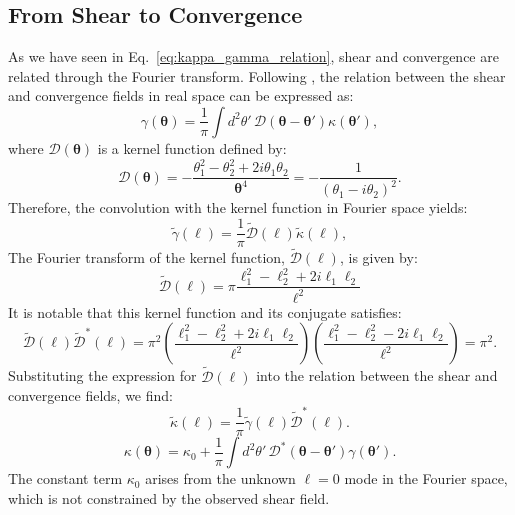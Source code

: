 \subsection{From Shear to Convergence}
As we have seen in Eq.~\eqref{eq:kappa_gamma_relation}, shear and convergence are related through the Fourier transform. Following \citet{1993ApJ...404..441K}, the relation between the shear and convergence fields in real space can be expressed as:
\begin{equation}
    \gamma(\boldsymbol{\theta}) = \frac{1}{\pi} \int d^2\theta' \, \mathcal{D}(\boldsymbol{\theta} - \boldsymbol{\theta'}) \kappa(\boldsymbol{\theta'}),
\end{equation}
where $\mathcal{D}(\boldsymbol{\theta})$ is a kernel function defined by:
\begin{equation}
    \mathcal{D}(\boldsymbol{\theta}) = - \frac{\theta_1^2 - \theta_2^2 + 2i\theta_1\theta_2}{\boldsymbol{\theta}^4} = - \frac{1}{(\theta_1 - i\theta_2)^2}.
\end{equation}
Therefore, the convolution with the kernel function in Fourier space yields:
\begin{equation}
    \tilde{\gamma}(\boldsymbol{\ell}) = \frac{1}{\pi}\tilde{\mathcal{D}}(\boldsymbol{\ell}) \tilde{\kappa}(\boldsymbol{\ell}),
\end{equation}
The Fourier transform of the kernel function,  $\tilde{\mathcal{D}}(\boldsymbol{\ell})$, is given by:
\begin{equation}
    \tilde{\mathcal{D}}(\boldsymbol{\ell}) = \pi \frac{\ell_1^2 - \ell_2^2 + 2i\ell_1\ell_2}{\ell^2} 
\end{equation}
It is notable that this kernel function and its conjugate satisfies:
\begin{equation}
    \tilde{\mathcal{D}}(\boldsymbol{\ell})\tilde{\mathcal{D}}^*(\boldsymbol{\ell}) = \pi^2 \left(\frac{\ell_1^2 - \ell_2^2 + 2i\ell_1\ell_2}{\ell^2}\right)\left(\frac{\ell_1^2 - \ell_2^2 - 2i\ell_1\ell_2}{\ell^2}\right) = \pi^2.
\end{equation}
Substituting the expression for $\tilde{\mathcal{D}}(\boldsymbol{\ell})$ into the relation between the shear and convergence fields, we find:
\begin{equation}
    \tilde{\kappa}(\boldsymbol{\ell}) = \frac{1}{\pi}\tilde{\gamma}(\boldsymbol{\ell}) \tilde{\mathcal{D}}^*(\boldsymbol{\ell}).
\end{equation}
\begin{equation}
    \kappa(\boldsymbol{\theta}) = \kappa_0 + \frac{1}{\pi} \int d^2\theta' \, \mathcal{D}^*(\boldsymbol{\theta} - \boldsymbol{\theta'}) \gamma(\boldsymbol{\theta'}).
\end{equation}
The constant term $\kappa_0$ arises from the unknown $\ell = 0$ mode in the Fourier space, which is not constrained by the observed shear field.

